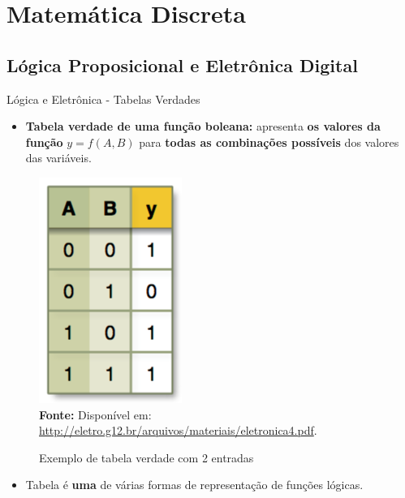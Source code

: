 
\section{Matemática Discreta}
	\subsection{Lógica Proposicional e Eletrônica Digital}
	\begin{frame}{Lógica e Eletrônica - Tabelas Verdades}
		\begin{itemize}
			\item \textbf{Tabela verdade de uma função boleana:} apresenta \textbf{os valores da função} $ y = f(A, B) $ para \textbf{todas as combinações possíveis} dos valores das variáveis.
		\end{itemize}

		\begin{multicols}{2}
			\begin{figure}[h]
				\centering
				\caption{Exemplo de tabela verdade com 2 entradas}
				\includegraphics[height=0.35\textheight]{img/ed/ed-tabela_verdade.png}
				\\
				{\footnotesize \textbf{Fonte:} Disponível em: \url{http://eletro.g12.br/arquivos/materiais/eletronica4.pdf}.}
				\label{fig:ed-tabela_verdade}
			\end{figure}
			\columnbreak
			\begin{itemize}
				\item Tabela é \textbf{uma} de várias formas de representação de funções lógicas.
			\end{itemize}
		\end{multicols}
	\end{frame}

